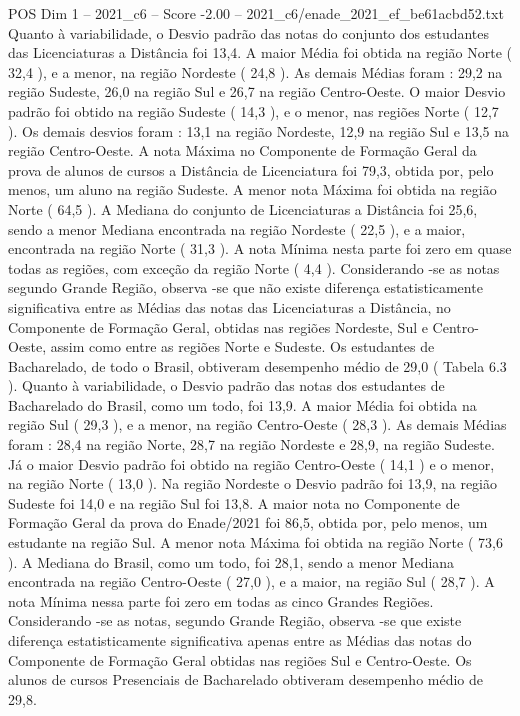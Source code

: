 \begin{textsample}{POS Dim 1 – 2021\_c6 – Score -2.00 – 2021\_c6/enade\_2021\_ef\_be61acbd52.txt}
Quanto à variabilidade, o Desvio padrão das notas do conjunto dos estudantes das Licenciaturas a Distância foi 13,4.
A maior Média foi obtida na região Norte ( 32,4 ), e a menor, na região Nordeste ( 24,8 ).
As demais Médias foram : 29,2 na região Sudeste, 26,0 na região Sul e 26,7 na região Centro-Oeste.
O maior Desvio padrão foi obtido na região Sudeste ( 14,3 ), e o menor, nas regiões Norte ( 12,7 ).
Os demais desvios foram : 13,1 na região Nordeste, 12,9 na região Sul e 13,5 na região Centro-Oeste.
A nota Máxima no Componente de Formação Geral da prova de alunos de cursos a Distância de Licenciatura foi 79,3, obtida por, pelo menos, um aluno na região Sudeste.
A menor nota Máxima foi obtida na região Norte ( 64,5 ).
A Mediana do conjunto de Licenciaturas a Distância foi 25,6, sendo a menor Mediana encontrada na região Nordeste ( 22,5 ), e a maior, encontrada na região Norte ( 31,3 ).
A nota Mínima nesta parte foi zero em quase todas as regiões, com exceção da região Norte ( 4,4 ).
Considerando -se as notas segundo Grande Região, observa -se que não existe diferença estatisticamente significativa entre as Médias das notas das Licenciaturas a Distância, no Componente de Formação Geral, obtidas nas regiões Nordeste, Sul e Centro-Oeste, assim como entre as regiões Norte e Sudeste.
Os estudantes de Bacharelado, de todo o Brasil, obtiveram desempenho médio de 29,0 ( Tabela 6.3 ).
Quanto à variabilidade, o Desvio padrão das notas dos estudantes de Bacharelado do Brasil, como um todo, foi 13,9.
A maior Média foi obtida na região Sul ( 29,3 ), e a menor, na região Centro-Oeste ( 28,3 ).
As demais Médias foram : 28,4 na região Norte, 28,7 na região Nordeste e 28,9, na região Sudeste.
Já o maior Desvio padrão foi obtido na região Centro-Oeste ( 14,1 ) e o menor, na região Norte ( 13,0 ).
Na região Nordeste o Desvio padrão foi 13,9, na região Sudeste foi 14,0 e na região Sul foi 13,8.
A maior nota no Componente de Formação Geral da prova do Enade/2021 foi 86,5, obtida por, pelo menos, um estudante na região Sul.
A menor nota Máxima foi obtida na região Norte ( 73,6 ).
A Mediana do Brasil, como um todo, foi 28,1, sendo a menor Mediana encontrada na região Centro-Oeste ( 27,0 ), e a maior, na região Sul ( 28,7 ).
A nota Mínima nessa parte foi zero em todas as cinco Grandes Regiões.
Considerando -se as notas, segundo Grande Região, observa -se que existe diferença estatisticamente significativa apenas entre as Médias das notas do Componente de Formação Geral obtidas nas regiões Sul e Centro-Oeste.
Os alunos de cursos Presenciais de Bacharelado obtiveram desempenho médio de 29,8.

\end{textsample}
